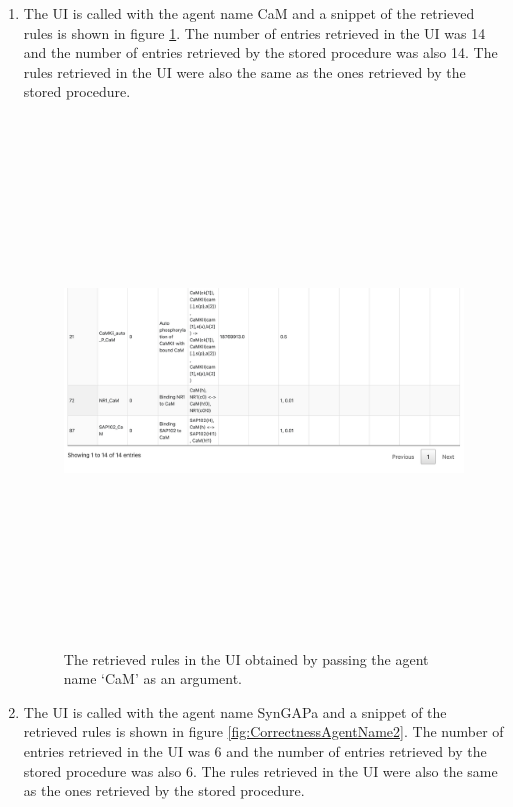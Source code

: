 \documentclass[msc,deptreport,ai]{infthesis}      %
\begin{document}
\begin{enumerate}
	\item The UI is called with the agent name CaM and a snippet of the retrieved rules is shown in figure \ref{fig:CorrectnessAgentName1}. The number of entries retrieved in the UI was 14 and the number of entries retrieved by the stored procedure was also 14. The rules retrieved in the UI were also the same as the ones retrieved by the stored procedure.
	\begin{figure}[H]
		\centering
		\captionsetup{justification=centering}
		\includegraphics[width=\linewidth,height=14cm,keepaspectratio]{CorrectnessAgentName1.png}	
		\caption{The retrieved rules in the UI obtained by passing the agent name `CaM' as an argument.}
		\label{fig:CorrectnessAgentName1}		
	\end{figure}
	\item The UI is called with the agent name SynGAPa and a snippet of the retrieved rules is shown in figure \ref{fig:CorrectnessAgentName2}. The number of entries retrieved in the UI was 6 and the number of entries retrieved by the stored procedure was also 6. The rules retrieved in the UI were also the same as the ones retrieved by the stored procedure. 
	\begin{figure}[H]
		\centering
		\captionsetup{justification=centering}

\end{figure}
\end{enumerate}
\end{document}
